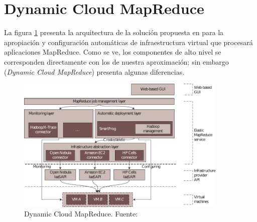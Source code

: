 \section{Dynamic Cloud MapReduce}\label{sec:dynamicmapreduce}
\noindent La figura \ref{fig:arquitecturadynamicmapreduce} presenta la arquitectura de la soluci\'on propuesta en \cite{dynamicmapreduce} para la apropiaci\'on y configuraci\'on autom\'aticas de infraestructura virtual que procesar\'a aplicaciones MapReduce. Como se ve, los componentes de alto nivel se corresponden directamente con los de nuestra aproximaci\'on; sin embargo (\emph{Dynamic Cloud MapReduce}) presenta algunas diferencias.

\begin{figure}[tbp]
\begin{center}
\includegraphics[width=0.9\textwidth]{imagenes/037.pdf}
 \caption{Dynamic Cloud MapReduce. Fuente: \cite{dynamicmapreduce}}
\label{fig:arquitecturadynamicmapreduce}
\end{center}
\end{figure}


